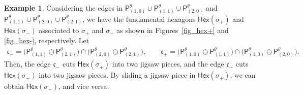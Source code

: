 \documentclass[10pt,a4paper]{amsart}
\numberwithin{equation}{section}
\theoremstyle{definition}
\newtheorem{Example}[Theorem]{Example}
\newcommand{\fkc}{\mathfrak{c}}
\newcommand{\sfP}{\mathsf{P}}
\newcommand{\Hex}{\mathsf{Hex}}
\begin{document}
\begin{Example}
Considering the edges in $\sfP^\theta_{(1,0)}\cup\sfP^\theta_{(1,1)}\cup\sfP^\theta_{(2,0)}$ and
$\sfP^\theta_{(1,1)}\cup\sfP^\theta_{(2,0)}\cup\sfP^\theta_{(2,1)}$,
we have the fundamental hexagons $\Hex(\sigma_+)$ and $\Hex(\sigma_-)$ associated to
$\sigma_+$ and $\sigma_-$ as shown in Figures~\ref{fig_hex+} and \ref{fig_hex-}, respectively.
Let
\begin{gather*}
\fkc_-=\bigl(\sfP^\theta_{(1,1)}\ominus\sfP^\theta_{(2,1)}\bigr)\cap\bigl(\sfP^\theta_{(2,0)}\ominus\sfP^\theta_{(2,1)}\bigr) , \qquad
\fkc_+=\bigl(\sfP^\theta_{(1,0)}\ominus\sfP^\theta_{(1,1)}\bigr)\cap\bigl(\sfP^\theta_{(1,0)}\ominus\sfP^\theta_{(2,0)}\bigr).
\end{gather*}
Then, the edge $\fkc_-$ cuts $\Hex(\sigma_+)$ into two jigsaw pieces, and the edge $\fkc_+$ cuts $\Hex(\sigma_-)$ into two jigsaw pieces.
By sliding a jigsaw piece in $\Hex(\sigma_+)$, we can obtain $\Hex(\sigma_-)$, and vice versa.

\newcommand{\jigsawbasicsetting}{
\foreach \n/\a/\b in {1/1.5/3, 2/3.5/3, 3/5.5/3, 4/7.5/3} {\coordinate (00B\n) at (\a,\b);}
\foreach \n/\a/\b in {1/0.5/1,2/2.5/1, 3/4.5/1, 4/6.5/1} {\coordinate (00W\n) at (\a,\b);}
\foreach \n/\a/\b in {1/1.5/3, 2/3.5/3, 3/5.5/3, 4/7.5/3} {\coordinate (10B\n) at (\a+8,\b);}
\foreach \n/\a/\b in {1/0.5/1,2/2.5/1, 3/4.5/1, 4/6.5/1} {\coordinate (10W\n) at (\a+8,\b);}
\foreach \n/\a/\b in {1/1.5/3, 2/3.5/3, 3/5.5/3, 4/7.5/3} {\coordinate (01B\n) at (\a,\b+4);}
\foreach \n/\a/\b in {1/0.5/1,2/2.5/1, 3/4.5/1, 4/6.5/1} {\coordinate (01W\n) at (\a,\b+4);}
\foreach \n/\a/\b in {1/1.5/3, 2/3.5/3, 3/5.5/3, 4/7.5/3} {\coordinate (11B\n) at (\a+8,\b+4);}
\foreach \n/\a/\b in {1/0.5/1,2/2.5/1, 3/4.5/1, 4/6.5/1} {\coordinate (11W\n) at (\a+8,\b+4);}
\foreach \n/\a/\b in {1/1.5/3, 2/3.5/3, 3/5.5/3, 4/7.5/3} {\coordinate (02B\n) at (\a,\b+8);}
\foreach \n/\a/\b in {1/0.5/1,2/2.5/1, 3/4.5/1, 4/6.5/1} {\coordinate (02W\n) at (\a,\b+8);}
\foreach \n/\a/\b in {1/1.5/3, 2/3.5/3, 3/5.5/3, 4/7.5/3} {\coordinate (12B\n) at (\a+8,\b+8);}
\foreach \n/\a/\b in {1/0.5/1,2/2.5/1, 3/4.5/1, 4/6.5/1} {\coordinate (12W\n) at (\a+8,\b+8);}
\coordinate (exB) at (7.5,-1); \coordinate (exW) at (16.5,5);
}


\end{Example}
\end{document}
